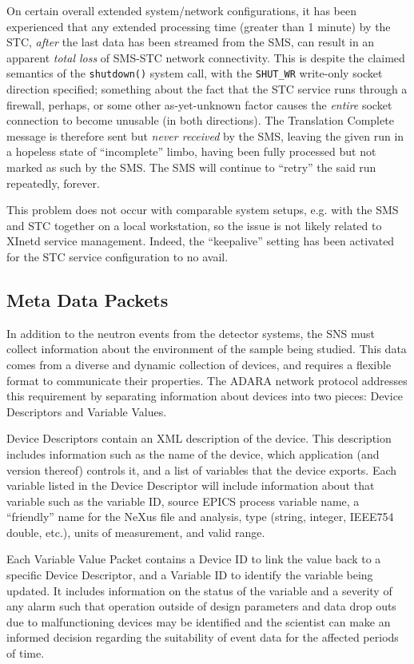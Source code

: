 On certain overall extended system/network configurations,
it has been experienced that any extended processing time
(greater than 1 minute) by the STC,
{\it after} the last data has been streamed from the SMS,
can result in an apparent {\it total loss} of SMS-STC network connectivity.
This is despite the claimed semantics of the {\tt shutdown()} system call,
with the {\tt SHUT\_WR} write-only socket direction specified;
something about the fact that the STC service runs through a firewall,
perhaps, or some other as-yet-unknown factor
causes the {\it entire} socket connection to become unusable
(in both directions).
The Translation Complete message is therefore sent
but {\it never received} by the SMS,
leaving the given run in a hopeless state of ``incomplete'' limbo,
having been fully processed but not marked as such by the SMS.
The SMS will continue to ``retry'' the said run repeatedly, forever.

This problem does not occur with comparable system setups,
e.g. with the SMS and STC together on a local workstation,
so the issue is not likely related to XInetd service management.
Indeed, the ``keepalive'' setting has been activated for the STC service
configuration to no avail.


\newpage
\subsection{Meta Data Packets}
\label{section:protocol_meta_data_packets}

In addition to the neutron events from the detector systems, the SNS must
collect information about the environment of the sample being studied. This
data comes from a diverse and dynamic collection of devices, and requires
a flexible format to communicate their properties. The ADARA network
protocol addresses this requirement by separating information about devices
into two pieces: Device Descriptors and Variable Values.

Device Descriptors contain an XML description of the device. This description
includes information such as the name of the device, which application (and
version thereof) controls it, and a list of variables that the device exports.
Each variable listed in the Device Descriptor will include information about
that variable such as the variable ID, source EPICS process variable name, a
``friendly'' name for the NeXus file and analysis, type (string, integer,
IEEE754 double, etc.), units of measurement, and valid range.

Each Variable Value Packet contains a Device ID to link the value back
to a specific Device Descriptor, and a Variable ID to identify the variable
being updated. It includes information on the status of the variable
and a severity of any alarm such that operation outside of design parameters
and data drop outs due to malfunctioning devices may be identified and
the scientist can make an informed decision regarding the suitability
of event data for the affected periods of time.

